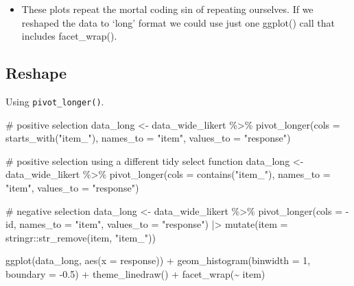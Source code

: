 \documentclass[
  letterpaper,
  DIV=11,
  numbers=noendperiod]{scrreprt}
\newenvironment{Shaded}{\begin{snugshade}}{\end{snugshade}}
\newcommand{\AttributeTok}[1]{\textcolor[rgb]{0.40,0.45,0.13}{#1}}
\newcommand{\CommentTok}[1]{\textcolor[rgb]{0.37,0.37,0.37}{#1}}
\newcommand{\DecValTok}[1]{\textcolor[rgb]{0.68,0.00,0.00}{#1}}
\newcommand{\FloatTok}[1]{\textcolor[rgb]{0.68,0.00,0.00}{#1}}
\newcommand{\FunctionTok}[1]{\textcolor[rgb]{0.28,0.35,0.67}{#1}}
\newcommand{\NormalTok}[1]{\textcolor[rgb]{0.00,0.23,0.31}{#1}}
\newcommand{\OtherTok}[1]{\textcolor[rgb]{0.00,0.23,0.31}{#1}}
\newcommand{\SpecialCharTok}[1]{\textcolor[rgb]{0.37,0.37,0.37}{#1}}
\newcommand{\StringTok}[1]{\textcolor[rgb]{0.13,0.47,0.30}{#1}}
\providecommand{\tightlist}{%
  \setlength{\itemsep}{0pt}\setlength{\parskip}{0pt}}\usepackage{longtable,booktabs,array}
\begin{document}
\begin{itemize}
\tightlist
\item
  These plots repeat the mortal coding sin of repeating ourselves. If we
  reshaped the data to `long' format we could use just one ggplot() call
  that includes facet\_wrap().
\end{itemize}

\subsection{Reshape}\label{reshape}

Using \texttt{pivot\_longer()}.

\begin{Shaded}
\begin{Highlighting}[]
\CommentTok{\# positive selection}
\NormalTok{data\_long }\OtherTok{\textless{}{-}}\NormalTok{ data\_wide\_likert }\SpecialCharTok{\%\textgreater{}\%}
  \FunctionTok{pivot\_longer}\NormalTok{(}\AttributeTok{cols =} \FunctionTok{starts\_with}\NormalTok{(}\StringTok{"item\_"}\NormalTok{),}
               \AttributeTok{names\_to =} \StringTok{"item"}\NormalTok{,}
               \AttributeTok{values\_to =} \StringTok{"response"}\NormalTok{)}

\CommentTok{\# positive selection using a different tidy select function}
\NormalTok{data\_long }\OtherTok{\textless{}{-}}\NormalTok{ data\_wide\_likert }\SpecialCharTok{\%\textgreater{}\%}
  \FunctionTok{pivot\_longer}\NormalTok{(}\AttributeTok{cols =} \FunctionTok{contains}\NormalTok{(}\StringTok{"item\_"}\NormalTok{),}
               \AttributeTok{names\_to =} \StringTok{"item"}\NormalTok{,}
               \AttributeTok{values\_to =} \StringTok{"response"}\NormalTok{)}

\CommentTok{\# negative selection}
\NormalTok{data\_long }\OtherTok{\textless{}{-}}\NormalTok{ data\_wide\_likert }\SpecialCharTok{\%\textgreater{}\%}
  \FunctionTok{pivot\_longer}\NormalTok{(}\AttributeTok{cols =} \SpecialCharTok{{-}}\NormalTok{id,}
               \AttributeTok{names\_to =} \StringTok{"item"}\NormalTok{,}
               \AttributeTok{values\_to =} \StringTok{"response"}\NormalTok{) }\SpecialCharTok{|\textgreater{}}
  \FunctionTok{mutate}\NormalTok{(}\AttributeTok{item =}\NormalTok{ stringr}\SpecialCharTok{::}\FunctionTok{str\_remove}\NormalTok{(item, }\StringTok{"item\_"}\NormalTok{))}

\FunctionTok{ggplot}\NormalTok{(data\_long, }\FunctionTok{aes}\NormalTok{(}\AttributeTok{x =}\NormalTok{ response)) }\SpecialCharTok{+}
  \FunctionTok{geom\_histogram}\NormalTok{(}\AttributeTok{binwidth =} \DecValTok{1}\NormalTok{, }\AttributeTok{boundary =} \SpecialCharTok{{-}}\FloatTok{0.5}\NormalTok{) }\SpecialCharTok{+}
  \FunctionTok{theme\_linedraw}\NormalTok{() }\SpecialCharTok{+}
  \FunctionTok{facet\_wrap}\NormalTok{(}\SpecialCharTok{\textasciitilde{}}\NormalTok{ item)}
\end{Highlighting}
\end{Shaded}
\end{document}
